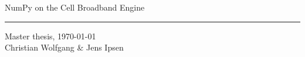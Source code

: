 \begin{titlepage}
 
\begin{center}

\Huge{NumPy on the Cell Broadband Engine}
\rule{\linewidth}{0.5mm}
\normalsize{Master thesis, \today}\\[1cm]

\Large{Christian Wolfgang \& Jens Ipsen}\\[1cm]

\vfill
 

 
\end{center}
 
\end{titlepage}
